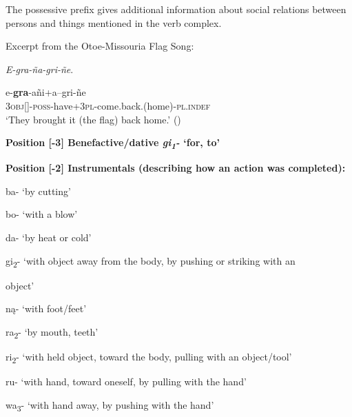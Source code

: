 \documentclass[output=paper]{LSP/langsci}
\begin{document}
The possessive prefix gives additional information about social relations between persons and things mentioned in the verb complex.				
\begin{exe}
\ex	Excerpt from the Otoe-Missouria Flag Song:  	
						           
\textit{E-gra-ña-gri-ñe}.

\gll e-\textbf{gra}-añi+a--gri-ñe \\		     
3\textsc{obj}[]-\textsc{poss}-have+3\textsc{pl}-come.back.(home)-\textsc{pl.indef} \\
\trans `They brought it (the flag) back home.' (\citealt{Greer2008})	 
\end{exe}

\textbf{Position [-3]  Benefactive/dative \textit{gi\textsubscript{1}-} `for, to'}    					         

\vspace{1em}
\textbf{Position [-2]  Instrumentals (describing how an action was completed):}					

\hspace{2em} ba- `by cutting' 
			
\hspace{2em} bo- `with a blow'      	

\hspace{2em} da- `by heat or cold' 	

\hspace{2em} gi\textsubscript{2}- `with object away from the body, by pushing or striking with an 

\hspace{3em} object' 			

\hspace{2em} n\k{a}- `with foot/feet'		

\hspace{2em} ra\textsubscript{2}- `by mouth, teeth'				

\hspace{2em} ri\textsubscript{2}-  `with held object, toward the body, pulling with an object/tool'    		

\hspace{2em} ru- `with hand, toward oneself, by pulling with the hand' 			

\hspace{2em} wa\textsubscript{3}- `with hand away, by pushing with the hand'
\vspace{1em}
\end{document}
